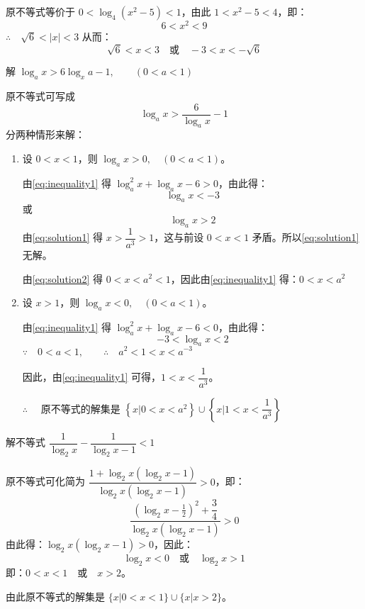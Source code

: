\begin{solution}
  原不等式等价于 $0<\log_4(x^2-5)<1$，由此 $1<x^2-5<4$，即：
\[6<x^2<9\]
$\therefore\quad \sqrt{6}<|x|<3$
从而：
\[\sqrt{6}<x<3\quad \text{或}\quad -3<x<-\sqrt{6}\]
\end{solution}

\begin{example}
  解 $\log_a x>6\log_x a-1,\qquad (0<a<1)$
\end{example}

\begin{solution}
  原不等式可写成
\begin{equation}
  \label{eq:inequality1}
  \log_a x>\frac{6}{\log_a x}-1
\end{equation}
分两种情形来解：
\begin{enumerate}
  \item 设 $0<x<1$，则 $\log_a x>0,\quad (0<a<1)$。
  
由\cref{eq:inequality1} 得 $\log_a^2 x+\log_a x-6>0$，由此得：
\begin{equation}
  \label{eq:solution1}
  \log_a x<-3
\end{equation}
或
\begin{equation}
  \label{eq:solution2}
  \log_a x>2
\end{equation}
由\cref{eq:solution1} 得 $x>\dfrac{1}{a^3}>1$，这与前设 $0<x<1$ 矛盾。所以\cref{eq:solution1} 无解。

由\cref{eq:solution2} 得 $0<x<a^2<1$，因此由\cref{eq:inequality1} 得：$0<x<a^2$

\item 设 $x>1$，则 $\log_a x<0,\quad (0<a<1)$。

由\cref{eq:inequality1} 得 $\log_a^2 x+\log_a x-6<0$，由此得：
\[-3<\log_a x<2\]
$\because\quad 0<a<1,\qquad \therefore\quad a^2<1<x<a^{-3}$

因此，由\cref{eq:inequality1} 可得，$1<x<\dfrac{1}{a^3}$。

$\therefore\quad $ 原不等式的解集是 $\left\{x|0<x<a^2\right\}\cup\left\{x\Big|1<x<\dfrac{1}{a^3}\right\}$
\end{enumerate}
\end{solution}

\begin{example}
  解不等式 $\dfrac{1}{\log_2 x}-\dfrac{1}{\log_2 x-1}<1$
\end{example}

\begin{solution}
  原不等式可化简为 $\dfrac{1+\log_2 x(\log_2 x-1)}{\log_2 x(\log_2 x-1)}>0$，即：
\[\frac{\left(\log_2 x-\frac{1}{2}\right)^2+\dfrac{3}{4}}{\log_2 x(\log_2 x-1)}>0\]
由此得：$\log_2 x(\log_2 x-1)>0$，因此：
\[\log_2 x<0\quad \text{或}\quad \log_2 x>1\]
即：$0<x<1\quad \text{或}\quad x>2$。

由此原不等式的解集是 $\{x|0<x<1\}\cup\{x|x>2\}$。
\end{solution}

